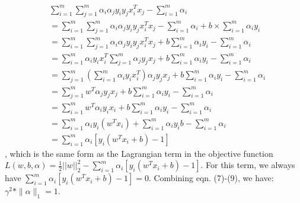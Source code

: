 \documentclass[11pt]{article}
\begin{document}
\begin{equation}
	\begin{aligned}
		&\sum_{i=1}^{m}\sum_{j=1}^{m}\alpha_i\alpha_jy_iy_jx^T_ix_j-\sum_{i=1}^{m}\alpha_i\\
		&=\sum_{i=1}^{m}\sum_{j=1}^{m}\alpha_i\alpha_jy_iy_jx^T_ix_j-\sum_{i=1}^{m}\alpha_i+b\times\sum_{i=1}^{m}\alpha_iy_i\\
		&=\sum_{i=1}^{m}\sum_{j=1}^{m}\alpha_i\alpha_jy_iy_jx^T_ix_j+b\sum_{i=1}^{m}\alpha_iy_i-\sum_{i=1}^{m}\alpha_i\\
		&=\sum_{i=1}^{m}\alpha_iy_ix^T_i \sum_{j=1}^{m}\alpha_jy_jx_j+b\sum_{i=1}^{m}\alpha_iy_i-\sum_{i=1}^{m}\alpha_i\\
		&=\sum_{j=1}^{m}(\sum_{i=1}^{m}\alpha_iy_ix^T_i)\alpha_jy_jx_j+b\sum_{i=1}^{m}\alpha_iy_i-\sum_{i=1}^{m}\alpha_i\\
		&=\sum_{j=1}^{m}w^T\alpha_jy_jx_j+b\sum_{i=1}^{m}\alpha_iy_i-\sum_{i=1}^{m}\alpha_i\\
		&=\sum_{i=1}^{m}w^T\alpha_iy_ix_i+b\sum_{i=1}^{m}\alpha_iy_i-\sum_{i=1}^{m}\alpha_i\\
		&=\sum_{i=1}^{m}\alpha_iy_i(w^Tx_i)+\sum_{i=1}^{m}\alpha_iy_ib-\sum_{i=1}^{m}\alpha_i\\
		&=\sum_{i=1}^{m}\alpha_i[y_i(w^Tx_i+b)-1]
	\end{aligned}
\end{equation}
, which is the same form as the Lagrangian term in the objective function $L(w,b,\alpha) = \frac{1}{2}||w||_2^2 - \sum\limits_{i=1}^{m}\alpha_i[y_i(w^Tx_i + b) - 1]$. For this term, we always have $\sum_{i=1}^{m}\alpha_i[y_i(w^Tx_i+b)-1]=0$. Combining eqn. (7)-(9), we have: $\gamma^2*\|\alpha\|_1=1$.
\end{document}
